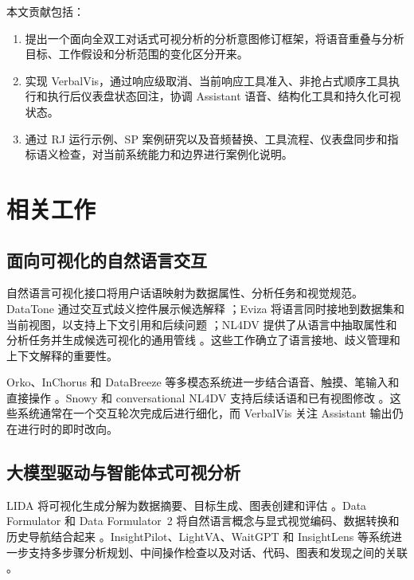\documentclass[UTF8,a4paper,10.5pt]{ctexart}
\begin{document}
本文贡献包括：

\begin{enumerate}
\item 提出一个面向全双工对话式可视分析的分析意图修订框架，将语音重叠与分析目标、工作假设和分析范围的变化区分开来。

\item 实现 VerbalVis，通过响应级取消、当前响应工具准入、非抢占式顺序工具执行和执行后仪表盘状态回注，协调 Assistant 语音、结构化工具和持久化可视状态。

\item 通过 RJ 运行示例、SP 案例研究以及音频替换、工具流程、仪表盘同步和指标语义检查，对当前系统能力和边界进行案例化说明。
\end{enumerate}

\section{相关工作}

\subsection{面向可视化的自然语言交互}

自然语言可视化接口将用户话语映射为数据属性、分析任务和视觉规范。DataTone 通过交互式歧义控件展示候选解释 \cite{gao2015datatone}；Eviza 将语言同时接地到数据集和当前视图，以支持上下文引用和后续问题 \cite{setlur2016eviza}；NL4DV 提供了从语言中抽取属性和分析任务并生成候选可视化的通用管线 \cite{narechania2021nl4dv}。这些工作确立了语言接地、歧义管理和上下文解释的重要性。

Orko、InChorus 和 DataBreeze 等多模态系统进一步结合语音、触摸、笔输入和直接操作 \cite{srinivasan2018orko,srinivasan2020inchorus,srinivasan2021databreeze}。Snowy 和 conversational NL4DV 支持后续话语和已有视图修改 \cite{srinivasan2021snowy,mitra2022conversational}。这些系统通常在一个交互轮次完成后进行细化，而 VerbalVis 关注 Assistant 输出仍在进行时的即时改向。

\subsection{大模型驱动与智能体式可视分析}

LIDA 将可视化生成分解为数据摘要、目标生成、图表创建和评估 \cite{dibia2023lida}。Data Formulator 和 Data Formulator~2 将自然语言概念与显式视觉编码、数据转换和历史导航结合起来 \cite{wang2024dataformulator,wang2024dataformulator2}。InsightPilot、LightVA、WaitGPT 和 InsightLens 等系统进一步支持多步骤分析规划、中间操作检查以及对话、代码、图表和发现之间的关联 \cite{ma2023insightpilot,zhao2024lightva,xie2024waitgpt,weng2025insightlens}。
\end{document}
